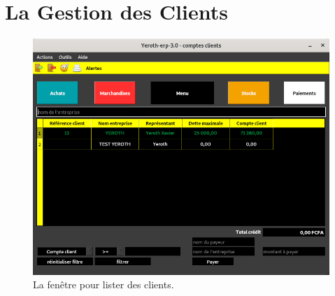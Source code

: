 \chapter{La Gestion des Clients}
\label{chap:gestion-des-clients}



\begin{figure}[!htbp]
\centering
\includegraphics[scale=0.63]{images/yeroth-lister-des-clients.png}
\caption{La fen\^etre pour lister des clients.}
\label{fig:fenetre-lister-des-clients}
\end{figure}